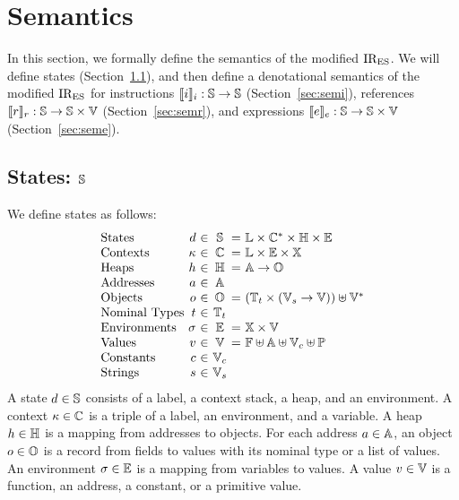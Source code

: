 \section{Semantics}\label{sec:semantics}
In this section, we formally define the semantics of the modified ${\text{IR}_\text{ES}}$.  We
will define states (Section~\ref{sec:state}), and then define a denotational
semantics of the modified ${\text{IR}_\text{ES}}$ for instructions $\llbracket{i}\rrbracket_i: \mathbb{S}
\rightarrow \mathbb{S}$ (Section~\ref{sec:semi}), references $\llbracket{r}\rrbracket_r: \mathbb{S}
\rightarrow \mathbb{S} \times \mathbb{V}$ (Section~\ref{sec:semr}), and expressions
$\llbracket{e}\rrbracket_e: \mathbb{S} \rightarrow \mathbb{S} \times \mathbb{V}$ (Section~\ref{sec:seme}).


\subsection{States: $\mathbb{S}$}\label{sec:state}
We define states as follows:
\[
  \vspace*{-1em}
  \begin{array}{l@{~}r@{~}c@{~}c@{~}r@{~}l}
    \text{States}
    &\elem&\in&\dom&=& \labset \times \ctxtset^* \times \heapset \times \envset\\

    \text{Contexts}
    &\ctxt&\in&\ctxtset&=& \labset \times \envset \times \varset\\

    \text{Heaps}
    &\heap&\in&\heapset&=& \addrset \rightarrow \objset\\

    \text{Addresses}
    &\addr&\in&\addrset\\

    \text{Objects}
    &\obj&\in&\objset&=& (\tnameset \times (\strset \rightarrow \valset)) \uplus
    \valset^*\\

    \text{Nominal Types}
    &\tname&\in&\tnameset\\

    \text{Environments}
    &\env&\in&\envset&=& \varset \times \valset\\

    \text{Values}
    &\val&\in&\valset&=& \funcset \uplus \addrset \uplus \constset \uplus \primset\\

    \text{Constants}
    &\const&\in&\constset\\

    \text{Strings}
    &\str&\in&\strset\\
  \end{array}
  \vspace*{1em}
\]
A state $d \in \mathbb{S}$ consists of a label, a context stack, a heap, and an
environment.  A context $\kappa \in \mathbb{C}$ is a triple of a label, an
environment, and a variable.  A heap $h \in \mathbb{H}$ is a mapping from
addresses to objects.  For each address $a \in \mathbb{A}$, an object $o
\in \mathbb{O}$ is a record from fields to values with its nominal type or a list
of values.  An environment $\sigma \in \mathbb{E}$ is a mapping from variables to
values.  A value $v \in \mathbb{V}$ is a function, an address, a constant, or a
primitive value.

